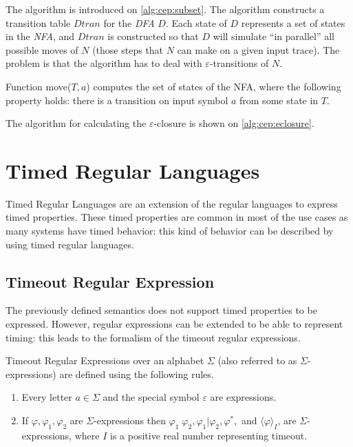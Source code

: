 			The algorithm is introduced on \cref{alg:cep:subset}.
			The algorithm constructs a transition table $\mathit{Dtran}$ for the \textit{DFA} $D$. Each state of $D$ represents a set of states in the \textit{NFA}, and $\mathit{Dtran}$ is constructed so that $D$ will simulate ``in parallel'' all possible moves of $N$ (those steps that $N$ can make on a given input trace). The problem is that the algorithm has to deal with $\varepsilon$-transitions of $N$.
	
			Function move($T,a$) computes the set of states of the NFA, where the following property holds: there is a transition on input symbol $a$ from some state in $T$. %
			
			The algorithm for calculating the $\varepsilon$-closure is shown on \cref{alg:cep:eclosure}.
			
		\section{Timed Regular Languages}	
		
		Timed Regular Languages are an extension of the regular languages to express timed properties.
		These timed properties are common in most of the use cases as many systems have timed behavior: this kind of behavior can be described by using timed regular languages.
		
			\subsection{Timeout Regular Expression}
		
			The previously defined semantics does not support timed properties to be expressed. However, regular expressions can be extended to be able to represent timing: this leads to the formalism of the timeout regular expressions.
			
			\begin{dfn}
				\label{dfn:cep:tre}
				Timeout Regular Expressions over an alphabet $\Sigma$ (also referred to as $\Sigma$-expressions)
				are defined using the following rules.
				\begin{enumerate}
					\item Every letter $a \in \Sigma$ and the special symbol $\varepsilon$ are expressions.
					\item If $\varphi, \varphi_1, \varphi_2$ are $\Sigma$-expressions then %
						$ %
						\varphi_1 \; \varphi_2,
						\varphi_1 | \varphi_2,
						\varphi^\ast,$ and 
						$\langle \varphi \rangle_I$, 
						are $\Sigma$-expressions, where $I$ is a positive real number representing timeout. %
				\end{enumerate}
			\end{dfn}
	

